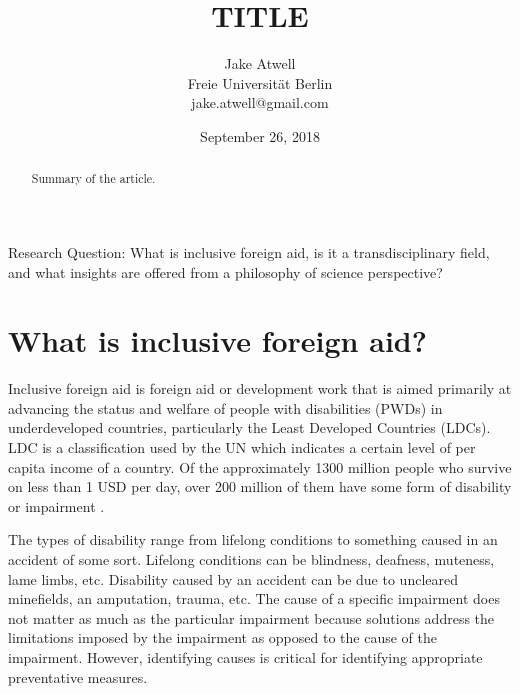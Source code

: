 \documentclass[a4paper]{article}
\begin{document}
\title{TITLE}
\author{Jake Atwell\\Freie Universität Berlin\\jake.atwell@gmail.com}
\date{September 26, 2018}

\maketitle



\begin{abstract}
Summary of the article.
\end{abstract}
\newpage

\noindent Research Question: What is inclusive foreign aid, is it a
transdisciplinary field, and what insights are offered from a philosophy of
science perspective?

\tableofcontents

\newpage
{} %




\section{What is inclusive foreign aid?}

Inclusive foreign aid is foreign aid or development work that is aimed
primarily at advancing the status and welfare of people with disabilities
(PWDs) in underdeveloped countries, particularly the Least Developed Countries
(LDCs). LDC is a classification used by the UN which indicates a certain level
of per capita income of a country. Of the approximately 1300 million people
who survive on less than 1 USD per day, over 200 million of them have some
form of disability or impairment \citep{chowdhury2006economics}. 

The types of disability range from lifelong conditions to something caused in
an accident of some sort. Lifelong conditions can be blindness, deafness,
muteness, lame limbs, etc. Disability caused by an accident can be due to
uncleared minefields, an amputation, trauma, etc. The cause of a specific
impairment does not matter as much as the particular impairment because
solutions address the limitations imposed by the impairment as opposed to the
cause of the impairment. However, identifying causes is critical for
identifying appropriate preventative measures.
\end{document}
